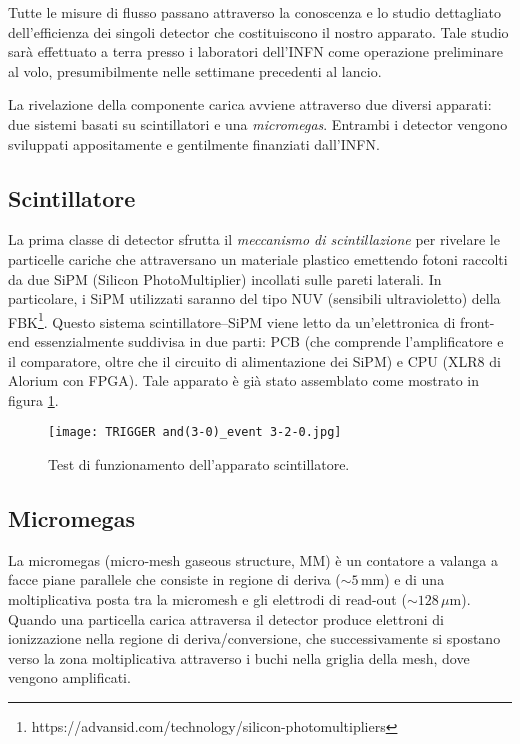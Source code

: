 Tutte le misure di flusso passano attraverso la conoscenza e lo studio dettagliato dell'efficienza dei singoli detector che costituiscono il nostro apparato. Tale studio sarà effettuato a terra presso i laboratori dell'INFN come operazione preliminare al volo, presumibilmente nelle settimane precedenti al lancio. 

La rivelazione della componente carica avviene attraverso due diversi apparati: due sistemi basati su scintillatori e una \emph{micromegas}. Entrambi i detector vengono sviluppati appositamente e gentilmente finanziati dall'INFN. 
\subsection{Scintillatore}
La prima classe di detector sfrutta il \emph{meccanismo di scintillazione} per rivelare le particelle cariche che attraversano un materiale plastico emettendo fotoni raccolti da due SiPM (Silicon PhotoMultiplier) incollati sulle pareti laterali. In particolare, i SiPM utilizzati saranno del tipo NUV (sensibili ultravioletto) della FBK\footnote{https://advansid.com/technology/silicon-photomultipliers}.
Questo sistema scintillatore--SiPM viene letto da un'elettronica di front-end essenzialmente suddivisa in due parti: PCB (che comprende l’amplificatore e il comparatore, oltre che il circuito di alimentazione dei SiPM) e CPU (XLR8 di Alorium con FPGA). Tale apparato è già stato assemblato come mostrato in figura \ref{Telescopio}.
\begin{figure}
\centering
\texttt{[image: TRIGGER and(3-0)\_event 3-2-0.jpg]}
\caption{Test di funzionamento dell'apparato scintillatore.}
\label{Telescopio}

\end{figure}

\subsection{Micromegas}
La micromegas (micro-mesh gaseous structure, MM) è un contatore a valanga a facce piane parallele che consiste in regione di deriva ($\sim 5\,\text{mm}$) e di una moltiplicativa posta tra la micromesh e gli elettrodi di read-out ($\sim 128\,\mu\text{m} $). 
Quando una particella carica attraversa il detector produce elettroni di ionizzazione nella regione di deriva/conversione, che successivamente si spostano verso la zona moltiplicativa attraverso i buchi nella griglia della mesh, dove vengono amplificati. 

